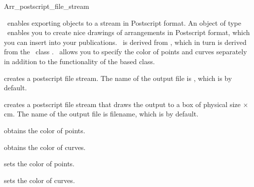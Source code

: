 \ccRefPageBegin

\begin{ccRefClass}{Arr_postscript_file_stream}

\ccDefinition

\ccRefName\ enables exporting  objects to a stream in
Postscript format. An object of type \ccRefName\ enables you to create nice
drawings of arrangements in Postscript format, which you can insert into 
your publications. \ccRefName\ is derived from ,
which in turn is derived from the \leda\ class . 
\ccRefName\ allows you to specify the color of points and curves separately
in addition to the functionality of the based class.


\ccInheritsFrom{}

\ccCreation
{}

  {creates a postscript file stream. The name of the output file is 
   , which is
    by default.}

  {creates a postscript file stream that draws the output to a box of physical 
   size 
    $\times$ 
   cm. The name of the output file is filename, which is
    by default.}

\ccAccessFunctions
    {obtains the color of points.}

    {obtains the color of curves.}

\ccModifiers

    {sets the color of points.}

    {sets the color of curves.}

\ccSeeAlso

\end{ccRefClass}

\ccRefPageEnd
